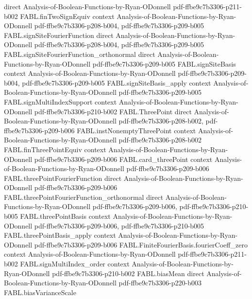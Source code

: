 \begin{theorem}
  {direct}
  {Analysis-of-Boolean-Functions-by-Ryan-ODonnell}
  {pdf-ffbe9c7b3306-p211-b002}
\proofstep
  {FABL.finTwoSignEquiv}
  {context}
  {Analysis-of-Boolean-Functions-by-Ryan-ODonnell}
  {pdf-ffbe9c7b3306-p208-b004,
    pdf-ffbe9c7b3306-p209-b005}
\proofstep
  {FABL.signSiteFourierFunction}
  {direct}
  {Analysis-of-Boolean-Functions-by-Ryan-ODonnell}
  {pdf-ffbe9c7b3306-p208-b004,
    pdf-ffbe9c7b3306-p209-b005}
\proofstep
  {FABL.signSiteFourierFunction_orthonormal}
  {direct}
  {Analysis-of-Boolean-Functions-by-Ryan-ODonnell}
  {pdf-ffbe9c7b3306-p209-b005}
\proofstep
  {FABL.signSiteBasis}
  {context}
  {Analysis-of-Boolean-Functions-by-Ryan-ODonnell}
  {pdf-ffbe9c7b3306-p209-b004,
    pdf-ffbe9c7b3306-p209-b005}
\proofstep
  {FABL.signSiteBasis_apply}
  {context}
  {Analysis-of-Boolean-Functions-by-Ryan-ODonnell}
  {pdf-ffbe9c7b3306-p209-b005}
\proofstep
  {FABL.signMultiIndexSupport}
  {context}
  {Analysis-of-Boolean-Functions-by-Ryan-ODonnell}
  {pdf-ffbe9c7b3306-p210-b002}
\proofstep
  {FABL.ThreePoint}
  {direct}
  {Analysis-of-Boolean-Functions-by-Ryan-ODonnell}
  {pdf-ffbe9c7b3306-p208-b002,
    pdf-ffbe9c7b3306-p209-b006}
\proofstep
  {FABL.instNonemptyThreePoint}
  {context}
  {Analysis-of-Boolean-Functions-by-Ryan-ODonnell}
  {pdf-ffbe9c7b3306-p208-b002}
\proofstep
  {FABL.finThreePointEquiv}
  {context}
  {Analysis-of-Boolean-Functions-by-Ryan-ODonnell}
  {pdf-ffbe9c7b3306-p209-b006}
\proofstep
  {FABL.card_threePoint}
  {context}
  {Analysis-of-Boolean-Functions-by-Ryan-ODonnell}
  {pdf-ffbe9c7b3306-p209-b006}
\proofstep
  {FABL.threePointFourierFunction}
  {direct}
  {Analysis-of-Boolean-Functions-by-Ryan-ODonnell}
  {pdf-ffbe9c7b3306-p209-b006}
\proofstep
  {FABL.threePointFourierFunction_orthonormal}
  {direct}
  {Analysis-of-Boolean-Functions-by-Ryan-ODonnell}
  {pdf-ffbe9c7b3306-p209-b006,
    pdf-ffbe9c7b3306-p210-b005}
\proofstep
  {FABL.threePointBasis}
  {context}
  {Analysis-of-Boolean-Functions-by-Ryan-ODonnell}
  {pdf-ffbe9c7b3306-p209-b006,
    pdf-ffbe9c7b3306-p210-b005}
\proofstep
  {FABL.threePointBasis_apply}
  {context}
  {Analysis-of-Boolean-Functions-by-Ryan-ODonnell}
  {pdf-ffbe9c7b3306-p209-b006}
\proofstep
  {FABL.FiniteFourierBasis.fourierCoeff_zero}
  {context}
  {Analysis-of-Boolean-Functions-by-Ryan-ODonnell}
  {pdf-ffbe9c7b3306-p211-b002}
\proofstep
  {FABL.signMultiIndex_order}
  {context}
  {Analysis-of-Boolean-Functions-by-Ryan-ODonnell}
  {pdf-ffbe9c7b3306-p210-b002}
\proofstep
  {FABL.biasMean}
  {direct}
  {Analysis-of-Boolean-Functions-by-Ryan-ODonnell}
  {pdf-ffbe9c7b3306-p220-b003}
\proofstep
  {FABL.biasVarianceScale}

\end{theorem}
